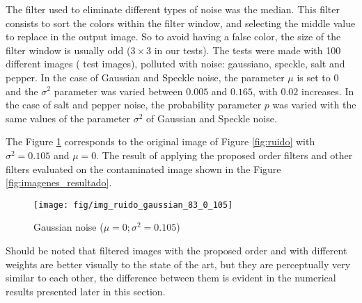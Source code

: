 The filter used to eliminate different types of noise was the median. This filter consists to sort the colors within the filter window, and selecting the middle value to replace in the output image. So to avoid having a false color, the size of the filter window is usually odd ($3\times 3$ in our tests). The tests were made with 100 different images ( \cite{arbelaez2007berkeley} test images), polluted with noise: gaussiano, speckle, salt and pepper. In the case of Gaussian and Speckle noise, the parameter $\mu$ is set to $0$ and the $\sigma^2$ parameter was varied between $0.005$ and $0.165$, with $0.02$ increases. In the case of salt and pepper noise, the probability parameter $p$ was varied with the same values of the parameter $\sigma^2$ of Gaussian and  Speckle noise.

The Figure \ref{fig:imagen_ejemplo_ruido_gaussiano} corresponds to the original image of Figure \ref{fig:ruido} with $\sigma^2 = 0.105$ and $\mu = 0$. The result of applying the proposed order filters and other filters  evaluated on the contaminated image shown in the Figure \ref{fig:imagenes_resultado}.


\begin{figure}
	\centering
	\texttt{[image: fig/img\_ruido\_gaussian\_83\_0\_105]}
	\caption{Gaussian noise ($\mu = 0; \sigma^2 = 0.105$)}
	\label{fig:imagen_ejemplo_ruido_gaussiano}
\end{figure}


Should be noted that filtered images with the proposed order and with different weights are better visually to the state of the art, but they are perceptually very similar to each other, the difference between them is evident in the numerical results presented later in this section.

